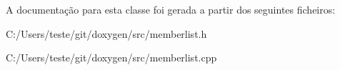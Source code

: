 A documentação para esta classe foi gerada a partir dos seguintes ficheiros\-:\begin{DoxyCompactItemize}
\item 
C\-:/\-Users/teste/git/doxygen/src/memberlist.\-h\item 
C\-:/\-Users/teste/git/doxygen/src/memberlist.\-cpp\end{DoxyCompactItemize}
